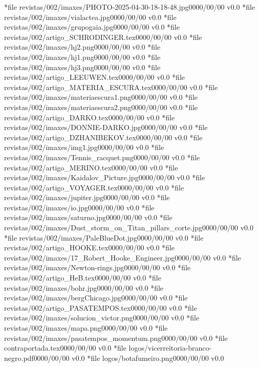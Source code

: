 {  *{file}   {revistas/002/imaxes/PHOTO-2025-04-30-18-18-48.jpg}{0000/00/00 v0.0}
  *{file}   {revistas/002/imaxes/vialactea.jpg}{0000/00/00 v0.0}
  *{file}   {revistas/002/imaxes/grupogaia.jpg}{0000/00/00 v0.0}
  *{file}   {revistas/002/artigo_SCHRODINGER.tex}{0000/00/00 v0.0}
  *{file}   {revistas/002/imaxes/hj2.png}{0000/00/00 v0.0}
  *{file}   {revistas/002/imaxes/hj1.png}{0000/00/00 v0.0}
  *{file}   {revistas/002/imaxes/hj3.png}{0000/00/00 v0.0}
  *{file}   {revistas/002/artigo_LEEUWEN.tex}{0000/00/00 v0.0}
  *{file}   {revistas/002/artigo_MATERIA_ESCURA.tex}{0000/00/00 v0.0}
  *{file}   {revistas/002/imaxes/materiaescura1.png}{0000/00/00 v0.0}
  *{file}   {revistas/002/imaxes/materiaescura2.png}{0000/00/00 v0.0}
  *{file}   {revistas/002/artigo_DARKO.tex}{0000/00/00 v0.0}
  *{file}   {revistas/002/imaxes/DONNIE-DARKO.jpg}{0000/00/00 v0.0}
  *{file}   {revistas/002/artigo_DZHANIBEKOV.tex}{0000/00/00 v0.0}
  *{file}   {revistas/002/imaxes/img1.jpg}{0000/00/00 v0.0}
  *{file}   {revistas/002/imaxes/Tennis_racquet.png}{0000/00/00 v0.0}
  *{file}   {revistas/002/artigo_MERINO.tex}{0000/00/00 v0.0}
  *{file}   {revistas/002/imaxes/Kaidalov_Picture.jpg}{0000/00/00 v0.0}
  *{file}   {revistas/002/artigo_VOYAGER.tex}{0000/00/00 v0.0}
  *{file}   {revistas/002/imaxes/jupiter.jpg}{0000/00/00 v0.0}
  *{file}   {revistas/002/imaxes/io.jpg}{0000/00/00 v0.0}
  *{file}   {revistas/002/imaxes/saturno.jpg}{0000/00/00 v0.0}
  *{file}   {revistas/002/imaxes/Dust_storm_on_Titan_pillars_corte.jpg}{0000/00/00 v0.0}
  *{file}   {revistas/002/imaxes/PaleBlueDot.jpg}{0000/00/00 v0.0}
  *{file}   {revistas/002/artigo_HOOKE.tex}{0000/00/00 v0.0}
  *{file}   {revistas/002/imaxes/17_Robert_Hooke_Engineer.jpg}{0000/00/00 v0.0}
  *{file}   {revistas/002/imaxes/Newton-rings.jpg}{0000/00/00 v0.0}
  *{file}   {revistas/002/artigo_HeB.tex}{0000/00/00 v0.0}
  *{file}   {revistas/002/imaxes/bohr.jpg}{0000/00/00 v0.0}
  *{file}   {revistas/002/imaxes/bergChicago.jpg}{0000/00/00 v0.0}
  *{file}   {revistas/002/artigo_PASATEMPOS.tex}{0000/00/00 v0.0}
  *{file}   {revistas/002/imaxes/solucion_victor.png}{0000/00/00 v0.0}
  *{file}   {revistas/002/imaxes/mapa.png}{0000/00/00 v0.0}
  *{file}   {revistas/002/imaxes/pasatempos_momentum.png}{0000/00/00 v0.0}
  *{file}   {contraportada.tex}{0000/00/00 v0.0}
  *{file}   {logos/vicerreitoria-branco-negro.pdf}{0000/00/00 v0.0}
  *{file}   {logos/botafumeiro.png}{0000/00/00 v0.0}
}


